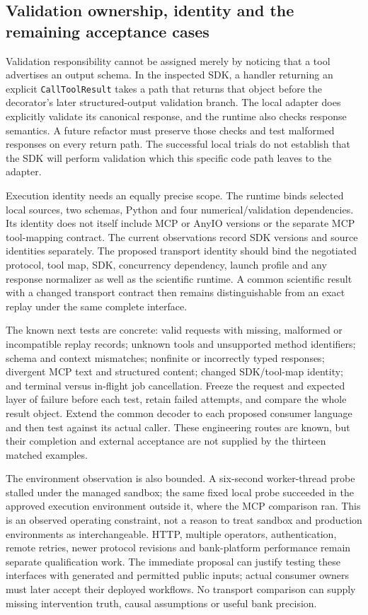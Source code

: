 \subsection{Validation ownership, identity and the remaining acceptance cases}

Validation responsibility cannot be assigned merely by noticing that a tool
advertises an output schema. In the inspected SDK, a handler returning an
explicit \texttt{CallToolResult} takes a path that returns that object before
the decorator's later structured-output validation branch. The local adapter
does explicitly validate its canonical response, and the runtime also checks
response semantics. A future refactor must preserve those checks and test
malformed responses on every return path. The successful local trials do not
establish that the SDK will perform validation which this specific code path
leaves to the adapter. \citep{exec16_parity_observed}

Execution identity needs an equally precise scope. The runtime binds selected
local sources, two schemas, Python and four numerical/validation dependencies.
Its identity does not itself include MCP or AnyIO versions or the separate
MCP tool-mapping contract. The current observations record SDK versions and
source identities separately. The proposed transport identity should bind
the negotiated protocol, tool map, SDK, concurrency dependency, launch profile
and any response normalizer as well as the scientific runtime. A common
scientific result with a changed transport contract then remains distinguishable
from an exact replay under the same complete interface.
\citep{exec16_parity_observed,exec16_parity_design}

The known next tests are concrete: valid requests with missing, malformed or
incompatible replay records; unknown tools and unsupported method identifiers;
schema and context mismatches; nonfinite or incorrectly typed responses;
divergent MCP text and structured content; changed SDK/tool-map identity;
and terminal versus in-flight job cancellation. Freeze the request and expected
layer of failure before each test, retain failed attempts, and compare the
whole result object. Extend the common decoder to each proposed consumer
language and then test against its actual caller. These engineering routes
are known, but their completion and external acceptance are not supplied by
the thirteen matched examples. \citep{exec16_parity_design}

The environment observation is also bounded. A six-second worker-thread probe
stalled under the managed sandbox; the same fixed local probe succeeded in
the approved execution environment outside it, where the MCP comparison ran.
This is an observed operating constraint, not a reason to treat sandbox and
production environments as interchangeable. HTTP, multiple operators,
authentication, remote retries, newer protocol revisions and bank-platform
performance remain separate qualification work. The immediate proposal can
justify testing these interfaces with generated and permitted public inputs;
actual consumer owners must later accept their deployed workflows. No transport
comparison can supply missing intervention truth, causal assumptions or useful
bank precision. \citep{exec16_parity_observed,exec16_parity_design}
\label{exec16:semantic-parity-end}
